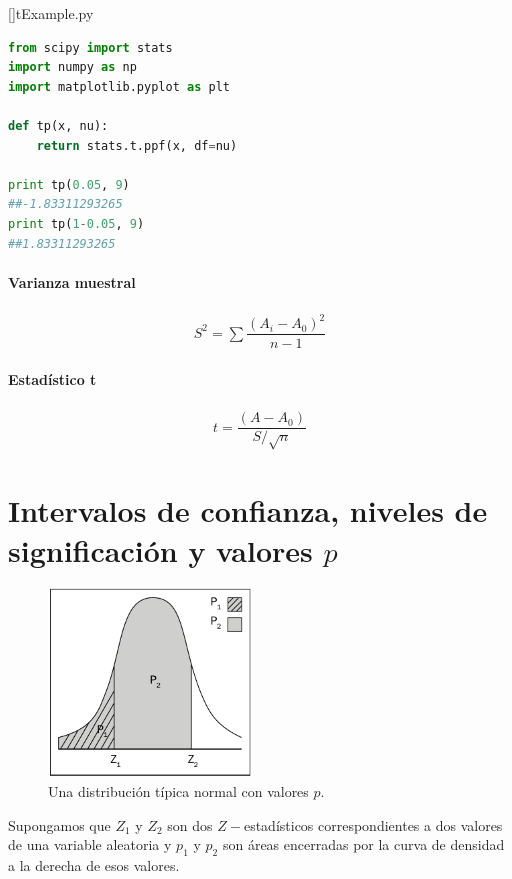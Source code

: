 []{tExample.py}
\begin{lstlisting}[language=Python]
from scipy import stats
import numpy as np
import matplotlib.pyplot as plt

def tp(x, nu):
    return stats.t.ppf(x, df=nu)

print tp(0.05, 9)
##-1.83311293265
print tp(1-0.05, 9)
##1.83311293265
\end{lstlisting}

\paragraph{Varianza muestral}
 \begin{align}
  S^{2}=\sum\dfrac{\left( A_{i}-A_{0} \right)^{2}}{n-1}
 \end{align}


\paragraph{Estadístico t}
\begin{align}
 t = \dfrac{\left( A-A_{0} \right)}{S/\sqrt{n}}
\end{align}



\section{Intervalos de confianza, niveles de significación y valores $p$}

\begin{figure}[h]
 \centering
 \includegraphics[height=5cm,keepaspectratio=true]{./images/kum0401.png}
 \caption{Una distribución típica normal con valores $p.$}
 \label{fig:0401}
\end{figure}



Supongamos que $Z_{1}$ y $Z_{2}$ son dos $Z-$estadísticos correspondientes a dos valores de una variable aleatoria y $p_{1}$ y $p_{2}$ son áreas encerradas por la curva de densidad a la derecha de esos valores.

